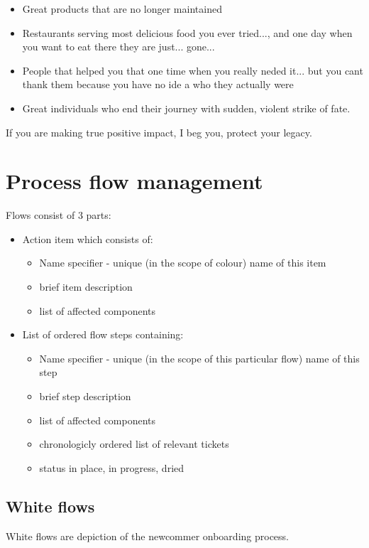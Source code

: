 \begin{enumerate}
  \begin{itemize}
    \item Great products that are no longer maintained
    \item Restaurants serving most delicious food you ever tried..., and one day when you want to eat there they are just... gone...
    \item People that helped you that one time when you really neded it... but you cant thank them because you have no ide a who they actually were 
    \item Great individuals who end their journey with sudden, violent strike of fate.
  \end{itemize} 
  If you are making true positive impact, I beg you, protect your legacy.
\end{enumerate} 
\newpage
\section{Process flow management}
Flows consist of 3 parts:
\begin{itemize}
  \item Action item which consists of:
  \begin{itemize}
    \item Name specifier - unique (in the scope of colour) name of this item
    \item brief item description
    \item list of affected components
  \end{itemize}
  \item List of ordered flow steps containing:
  \begin{itemize}
    \item Name specifier - unique (in the scope of this particular flow) name of this step
    \item brief step description
    \item list of affected components
    \item chronologicly ordered list of relevant tickets
    \item status {in place, in progress, dried}
  \end{itemize}
\end{itemize}

\subsection{White flows}\label{philo:white:flow}
White flows are depiction of the newcommer onboarding process. 
